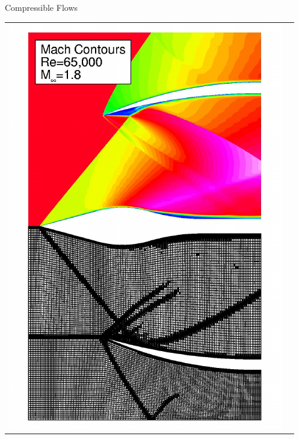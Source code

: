 \documentclass[landscape,pdftex,headrule,footrule]{foils}
\begin{document}
\begin{foil}[-.25in]{Compressible Flows}
{{\begin{center}
\begin{tabular}{cc}
          \includegraphics[height=.85\textheight]{figures/inlet} \\
        \end{tabular}
      \end{center}
    }
    }
\end{foil}
\end{document}
